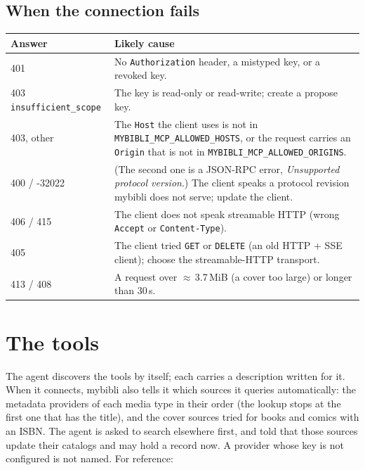 \subsection{When the connection fails}

\begin{center}\small
\begin{tabular}{@{} l >{\raggedright\arraybackslash}p{10cm} @{}}
\toprule
\textbf{Answer} & \textbf{Likely cause} \\
\midrule
401 & No \texttt{Authorization} header, a mistyped key, or a revoked
      key. \\
403 \texttt{insufficient\_scope} & The key is read-only or
      read-write; create a propose key. \\
403, other & The \texttt{Host} the client uses is not in
      \texttt{MYBIBLI\_MCP\_ALLOWED\_HOSTS}, or the request carries an
      \texttt{Origin} that is not in
      \texttt{MYBIBLI\_MCP\_ALLOWED\_ORIGINS}. \\
400 / -32022 & (The second one is a JSON-RPC error,
      \emph{Unsupported protocol version}.) The client speaks a protocol revision mybibli does not serve; update the
      client. \\
406 / 415 & The client does not speak streamable HTTP (wrong
      \texttt{Accept} or \texttt{Content-Type}). \\
405 & The client tried \texttt{GET} or \texttt{DELETE} (an old
      HTTP + SSE client); choose the streamable-HTTP transport. \\
413 / 408 & A request over $\approx$\,3.7\,MiB (a cover too large) or
      longer than 30\,s. \\
\bottomrule
\end{tabular}
\end{center}

\section{The tools}
\label{sec:agents-tools}

The agent discovers the tools by itself; each carries a description
written for it. When it connects, mybibli also tells it which sources
it queries automatically: the metadata providers of each media type in
their order (the lookup stops at the first one that has the title), and
the cover sources tried for books and comics with an ISBN. The agent is
asked to search elsewhere first, and told that those sources update
their catalogs and may hold a record now. A provider whose key is not configured is
not named. For reference:

